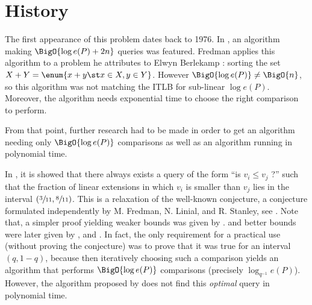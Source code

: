 \section{History}

The first appearance of this problem dates back to 1976. In
\cite{fredman:1976}, an algorithm making $\BigO{\log e(P) + 2n}$ queries was
featured. Fredman applies this algorithm to a problem he attributes to Elwyn
Berlekamp : sorting the set $X + Y = \enum{x + y \st x \in X, y \in Y}$. However
$\BigO{\log e(P)} \neq \BigO{n}$, so this algorithm was not matching the ITLB
for sub-linear $\log e(P)$. Moreover, the algorithm needs exponential time to
choose the right comparison to perform.

From that point, further research had to be made in order to get an algorithm
needing only $\BigO{\log e(P)}$ comparisons as well as an algorithm running in
polynomial time.

In \cite{kahn1984balancing}, it is showed that there always exists a query of
the form ``is $v_i \leq v_j$ ?'' such that the fraction of linear extensions in
which $v_i$ is smaller than $v_j$ lies in the interval $(\sfrac{3}{11},
\sfrac{8}{11})$. This is a relaxation of the well-known
\onethirdtwothird conjecture, a conjecture formulated
independently by M. Fredman, N. Linial, and R. Stanley, see
\cite{linial1984information}. Note that, a simpler proof yielding weaker bounds
was given by \cite{kahn1991balancing}. and better bounds were later given by
\cite{brightwell1995balancing}, and \cite{brightwell1999balanced}. In fact, the
only requirement for a practical use (without proving the conjecture) was to
prove that it was true for an interval $(q, 1-q)$, because then iteratively
choosing such a comparison yields an algorithm that performs $\BigO{\log e(P)}$
comparisons (precisely $\log_{q^{-1}} e(P)$). However, the algorithm proposed
by \cite{kahn1984balancing} does not find this \emph{optimal} query in
polynomial time.
